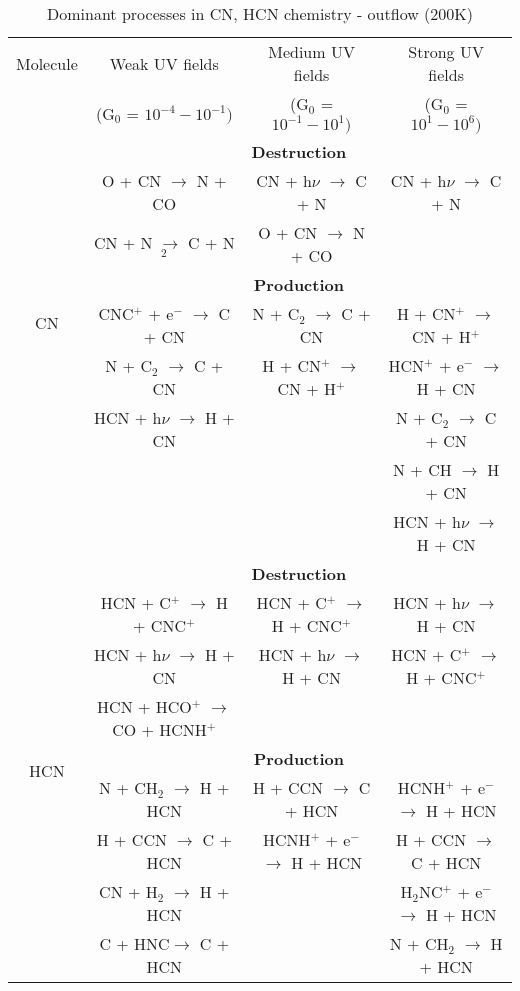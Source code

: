\documentclass{aa}
\begin{document}
\begin{appendix}
\begin{table*} 
\caption{Dominant processes in CN, HCN chemistry - outflow (200K)} %
\label{reactions_200} %
\begin{tabular}{c c c c} \hline\hline Molecule & Weak UV fields & Medium UV fields & Strong UV fields \\
& (G$_0$ = $10^{-4} - 10^{-1})$ & (G$_0$ = $10^{-1} - 10^{1})$ & (G$_0$ = $10^{1} - 10^{6})$ \\ 
\hline 
\multirow{8}{*}{CN} & \multicolumn{3}{c}{\textbf{Destruction}}\\
&O + CN $\rightarrow$ N + CO & CN + h$\nu$ $\rightarrow$ C + N & CN + h$\nu$ $\rightarrow$ C + N\\
&CN + N $\rightarrow$ C + N$_2$ & O + CN $\rightarrow$ N + CO & \\
\vspace{2.5 pt} & \multicolumn{3}{c}{\textbf{Production}}\\ 
&CNC$^+$ + e$^-$ $\rightarrow$ C + CN & N + C$_2$ $\rightarrow$ C + CN & H + CN$^+$ $\rightarrow$ CN + H$^+$\\ 
&N + C$_2$ $\rightarrow$ C + CN & H + CN$^+$ $\rightarrow$ CN + H$^+$ & HCN$^+$ + e$^-$ $\rightarrow$ H + CN \\
&HCN + h$\nu$ $\rightarrow$ H + CN & & N + C$_2$ $\rightarrow$ C + CN\\
& & & N + CH $\rightarrow$ H + CN\\ 
& & & HCN + h$\nu$ $\rightarrow$ H + CN\\ 
\hline 
\multirow{9}{*}{HCN} & \multicolumn{3}{c}{\textbf{Destruction}}\\ 
&HCN + C$^+$ $\rightarrow$ H + CNC$^+$ & HCN + C$^+$ $\rightarrow$ H + CNC$^+$ & HCN + h$\nu$ $\rightarrow$ H + CN\\
&HCN + h$\nu$ $\rightarrow$ H + CN &HCN + h$\nu$ $\rightarrow$ H + CN & HCN + C$^+$ $\rightarrow$ H + CNC$^+$\\
&HCN + HCO$^+$ $\rightarrow$ CO + HCNH$^+$ & & \\
\vspace{2.5 pt} &\multicolumn{3}{c}{\textbf{Production}}\\
&N + CH$_2$ $\rightarrow$ H + HCN & H + CCN $\rightarrow$ C + HCN & HCNH$^+$ + e$^-$ $\rightarrow$ H + HCN\\
&H + CCN $\rightarrow$ C + HCN & HCNH$^+$ + e$^-$ $\rightarrow$ H + HCN & H + CCN $\rightarrow$ C +
HCN\\ &CN + H$_2$ $\rightarrow$ H + HCN & & H$_2$NC$^+$ + e$^-$ $\rightarrow$ H + HCN 
\\ &C + HNC$\rightarrow$ C + HCN & & N + CH$_2$ $\rightarrow$ H + HCN \\ 
\hline 
\end{tabular} 
\end{table*}



\end{appendix}
\end{document}
